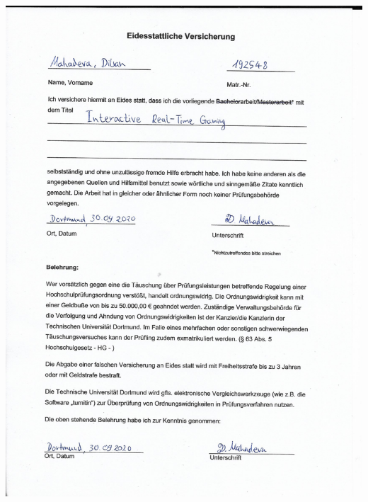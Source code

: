 %
\pagestyle{empty}
\includegraphics[trim = 20mm 20mm 20mm 10mm, clip,
width=\textwidth]{Dilsan_Eidesstattliche_Versicherung.pdf}

